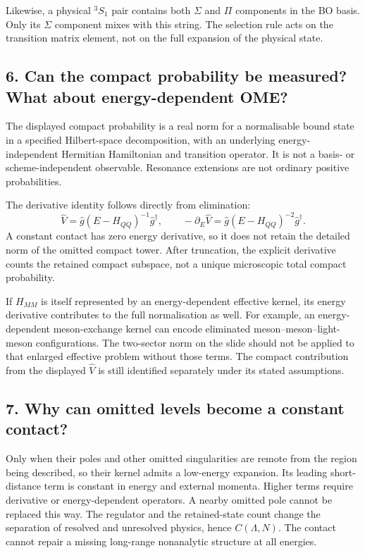 \documentclass[11pt,a4paper]{article}
\begin{document}
Likewise, a physical ${}^3S_1$ pair contains both $\Sigma$ and $\Pi$
components in the BO basis. Only its $\Sigma$ component mixes with this
string. The selection rule acts on the transition matrix element, not
on the full expansion of the physical state.

\subsection*{6. Can the compact probability be measured? What about energy-dependent OME?}
The displayed compact probability is a real norm for a normalisable bound
state in a specified Hilbert-space decomposition, with an underlying
energy-independent Hermitian Hamiltonian and transition operator.
It is not a basis- or scheme-independent observable. Resonance extensions
are not ordinary positive probabilities.

The derivative identity follows directly from elimination:
\[
 \hat V=\hat g(E-H_{QQ})^{-1}\hat g^\dagger,
 \qquad
 -\partial_E\hat V=\hat g(E-H_{QQ})^{-2}\hat g^\dagger.
\]
A constant contact has zero energy derivative, so it does not retain
the detailed norm of the omitted compact tower. After truncation, the
explicit derivative counts the retained compact subspace, not a unique
microscopic total compact probability.

If $H_{MM}$ is itself represented by an energy-dependent effective kernel,
its energy derivative contributes to the full normalisation as well.
For example, an energy-dependent meson-exchange kernel can encode
eliminated meson--meson--light-meson configurations. The two-sector norm
on the slide should not be applied to that enlarged effective problem
without those terms. The compact contribution from the displayed
$\hat V$ is still identified separately under its stated assumptions.

\subsection*{7. Why can omitted levels become a constant contact?}
Only when their poles and other omitted singularities are remote from
the region being described, so their kernel admits a low-energy
expansion. Its leading short-distance term is constant in energy and
external momenta. Higher terms require derivative or energy-dependent
operators. A nearby omitted pole cannot be replaced this way.
The regulator and the retained-state count change the separation of
resolved and unresolved physics, hence $C(\Lambda,N)$. The contact
cannot repair a missing long-range nonanalytic structure at all energies.
\end{document}
